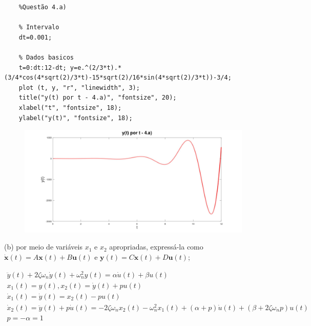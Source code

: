 \documentclass[10pt]{article}
\newcommand{\bm}[1]{\boldsymbol{#1}}
\begin{document}
\begin{verbatim}
    %Questão 4.a)

    % Intervalo
    dt=0.001;

    % Dados basicos
    t=0:dt:12-dt; y=e.^(2/3*t).*(3/4*cos(4*sqrt(2)/3*t)-15*sqrt(2)/16*sin(4*sqrt(2)/3*t))-3/4;
    plot (t, y, "r", "linewidth", 3);
    title("y(t) por t - 4.a)", "fontsize", 20);
    xlabel("t", "fontsize", 18);
    ylabel("y(t)", "fontsize", 18);
\end{verbatim}

\begin{figure}[h]
    \includegraphics[scale=0.15]{questao4a.jpg}
    \centering
\end{figure}

(b) por meio de variáveis $x_1$ e $x_2$ apropriadas, expressá-la como $\dot{\bm{x}}(t) = A\bm{x}(t) + B\bm{u}(t)$ e $\bm{y}(t) = C\bm{x}(t) + D\bm{u}(t)$;

\begin{align*}
    \ddot{y}(t) + 2\zeta \omega_n \dot{y}(t) + \omega_n^2 y(t) = \alpha \dot{u}(t) + \beta u(t) \\
    x_1(t) = y(t), x_2(t) = \dot{y}(t) + pu(t) \\
    \dot{x}_1(t) = \dot{y}(t) = x_2(t) - pu(t) \\
    \dot{x}_2(t) = \ddot{y}(t) + p\dot{u}(t) = -2\zeta \omega_n x_2(t) - \omega_n^2 x_1(t) + (\alpha + p)\dot{u}(t) + (\beta + 2\zeta\omega_n p)u(t) \\
    p = - \alpha = 1
\end{align*}
\end{document}
